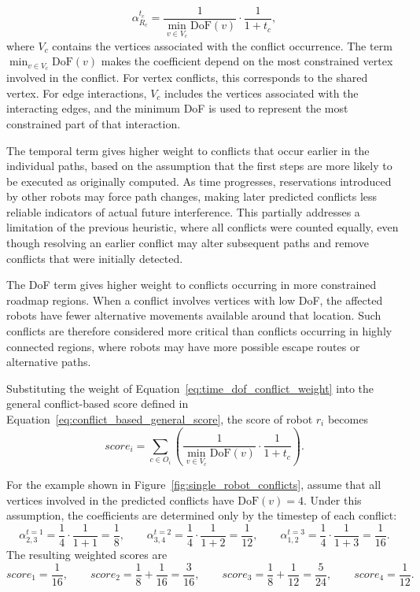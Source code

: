 \begin{equation}
    \alpha^{t_c}_{R_c}
    =
    \frac{1}{\min\limits_{v \in V_c}\mathrm{DoF}(v)}
    \cdot
    \frac{1}{1+t_c},
    \label{eq:time_dof_conflict_weight}
\end{equation}
where \(V_c\) contains the vertices associated with the conflict occurrence. The term \(\min_{v \in V_c}\mathrm{DoF}(v)\) makes the coefficient depend on the most constrained vertex involved in the conflict. For vertex conflicts, this corresponds to the shared vertex. For edge interactions, \(V_c\) includes the vertices associated with the interacting edges, and the minimum DoF is used to represent the most constrained part of that interaction.

The temporal term gives higher weight to conflicts that occur earlier in the individual paths, based on the assumption that the first steps are more likely to be executed as originally computed. As time progresses, reservations introduced by other robots may force path changes, making later predicted conflicts less reliable indicators of actual future interference. This partially addresses a limitation of the previous heuristic, where all conflicts were counted equally, even though resolving an earlier conflict may alter subsequent paths and remove conflicts that were initially detected.

The DoF term gives higher weight to conflicts occurring in more constrained roadmap regions. When a conflict involves vertices with low DoF, the affected robots have fewer alternative movements available around that location. Such conflicts are therefore considered more critical than conflicts occurring in highly connected regions, where robots may have more possible escape routes or alternative paths.

Substituting the weight of Equation~\ref{eq:time_dof_conflict_weight} into the general conflict-based score defined in Equation~\ref{eq:conflict_based_general_score}, the score of robot $r_i$ becomes
\begin{equation}
    score_i
    =
    \sum_{c \in O_i}
    \left(
    \frac{1}{\min\limits_{v \in V_c}\mathrm{DoF}(v)}
    \cdot
    \frac{1}{1+t_c}
    \right).
    \label{eq:time_dof_weighted_conflict_score}
\end{equation}

For the example shown in Figure~\ref{fig:single_robot_conflicts}, assume that all vertices involved in the predicted conflicts have \(\mathrm{DoF}(v)=4\). Under this assumption, the coefficients are determined only by the timestep of each conflict:
\[
    \alpha_{2,3}^{t=1}
    =
    \frac{1}{4}\cdot\frac{1}{1+1}
    =
    \frac{1}{8},
    \qquad
    \alpha_{3,4}^{t=2}
    =
    \frac{1}{4}\cdot\frac{1}{1+2}
    =
    \frac{1}{12},
    \qquad
    \alpha_{1,2}^{t=3}
    =
    \frac{1}{4}\cdot\frac{1}{1+3}
    =
    \frac{1}{16}.
\]
The resulting weighted scores are
\[
    score_1 = \frac{1}{16}, \qquad
    score_2 = \frac{1}{8} + \frac{1}{16} = \frac{3}{16}, \qquad
    score_3 = \frac{1}{8} + \frac{1}{12} = \frac{5}{24}, \qquad
    score_4 = \frac{1}{12}.
\]


